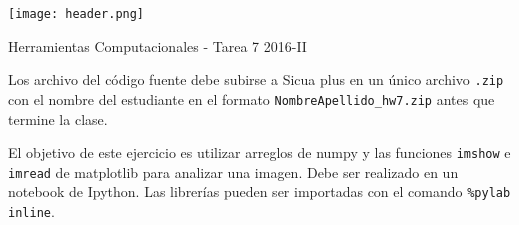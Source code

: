 \documentclass[11pt,letterpaper]{exam}
\begin{document}
\begin{center}

\texttt{[image: header.png]}

\vspace{1.0cm}
{\Large Herramientas Computacionales - Tarea 7}
2016-II
\end{center}



\vspace{0.5cm}

\noindent
Los archivo del c\'odigo fuente debe subirse a Sicua plus en un \'unico archivo
\verb".zip" con el nombre del estudiante en el formato \verb"NombreApellido_hw7.zip" antes que termine la clase.

El objetivo de este ejercicio es utilizar arreglos de numpy y las funciones \verb'imshow' e \verb'imread' de matplotlib para analizar una imagen. Debe ser realizado en un notebook de Ipython. Las librer\'ias pueden ser importadas con el comando \verb'%pylab inline'.

\vspace{0.5cm}
\end{document}
